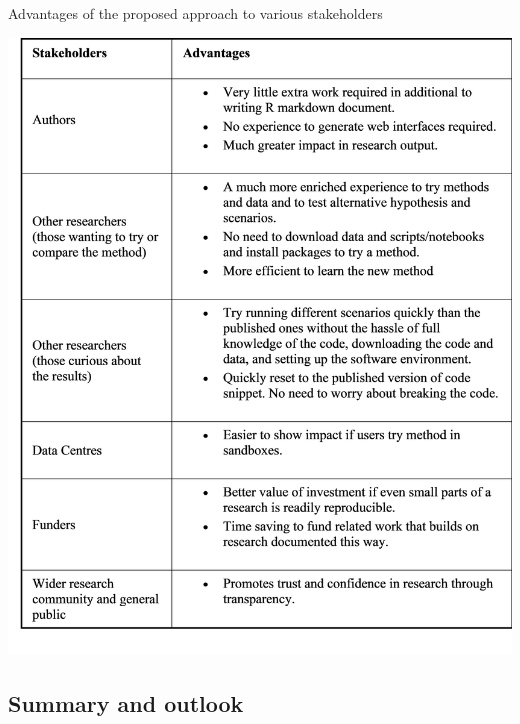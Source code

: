 \begin{table}
  \caption{Advantages of the proposed approach to various stakeholders}
  \label{tbl:table2}
  \includegraphics[width=\linewidth]{GB_notebook_table1}
\end{table}

\hypertarget{summary-and-outlook}{%
\subsection{Summary and outlook}\label{summary-and-outlook}}

